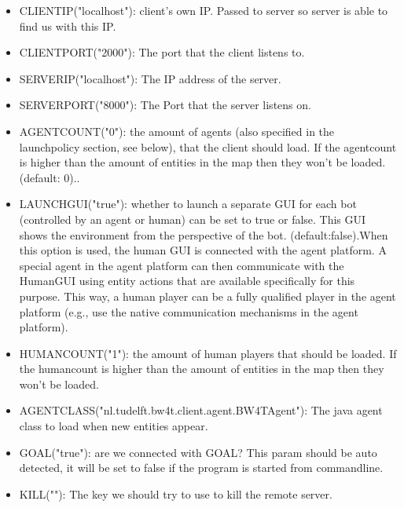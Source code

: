 \documentclass[11pt,a4paper]{article}
\begin{document}
\begin{itemize}
\item

    CLIENTIP("localhost"):    client's own IP. Passed to server so server is able to find us with this IP. 

\item
    CLIENTPORT("2000"):   The port that the client listens to. 


\item
    SERVERIP("localhost"):
 The IP address of the server. 
  
\item
    SERVERPORT("8000"):
   The Port that the server listens on. 

\item
    AGENTCOUNT("0"):
 the amount of agents (also specified in the launchpolicy section, see below), that the client should load. If the agentcount is higher than the amount of entities in the map then they won't be loaded. (default: 0).. 
    
\item
    LAUNCHGUI("true"):
    whether to launch a separate GUI for each bot (controlled by an agent or human) can be set to true or false. This GUI shows the environment from the perspective of the bot. (default:false).When this option is used, the human GUI is connected with the agent platform. A special agent in the agent platform can then communicate with the HumanGUI using entity actions that are available specifically for this purpose. This way, a human player can be a fully qualified player in the agent platform (e.g., use the native communication mechanisms in the agent platform).


\item
    HUMANCOUNT("1"):
    the amount of human players that should be loaded. If the humancount is higher than the amount of entities in the map then they won't be loaded. 

\item
    AGENTCLASS("nl.tudelft.bw4t.client.agent.BW4TAgent"):
    The java agent class to load when new entities appear.
   

\item
    GOAL("true"):
    are we connected with GOAL? This param should be auto detected, it will be set to false if the program is started from commandline.

\item
    KILL(""):
  The key we should try to use to kill the remote server.
 

\end{itemize}
\end{document}
